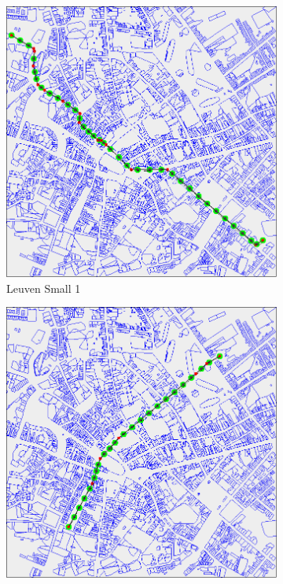 \begin{figure}
	\centering
	
	\begin{subfigure}[t]{0.46\textwidth}
        		\includegraphics[width=\textwidth]{img/leuven-small-1}
        		\caption{Leuven Small 1}
        		\label{fig:leuven-small-1}
	\end{subfigure}
	\hfil	
	\begin{subfigure}[t]{0.46\textwidth}
        		\includegraphics[width=\textwidth]{img/leuven-small-2}

\end{subfigure}
\end{figure}

